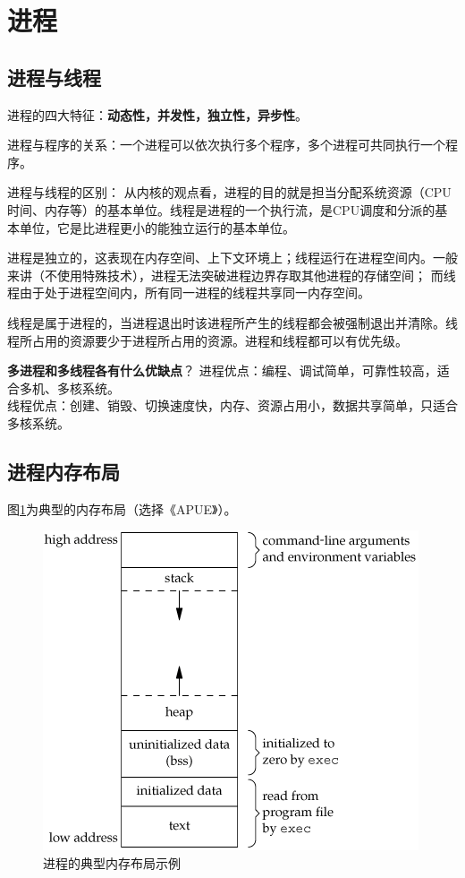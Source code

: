 
\section{进程}

\subsection{进程与线程}
进程的四大特征：\textbf{动态性，并发性，独立性，异步性}。

进程与程序的关系：一个进程可以依次执行多个程序，多个进程可共同执行一个程序。

进程与线程的区别：
从内核的观点看，进程的目的就是担当分配系统资源（CPU时间、内存等）的基本单位。线程是进程的一个执行流，是CPU调度和分派的基本单位，它是比进程更小的能独立运行的基本单位。

进程是独立的，这表现在内存空间、上下文环境上；线程运行在进程空间内。一般来讲（不使用特殊技术），进程无法突破进程边界存取其他进程的存储空间；
而线程由于处于进程空间内，所有同一进程的线程共享同一内存空间。

线程是属于进程的，当进程退出时该进程所产生的线程都会被强制退出并清除。线程所占用的资源要少于进程所占用的资源。进程和线程都可以有优先级。

\textbf{多进程和多线程各有什么优缺点}？
进程优点：编程、调试简单，可靠性较高，适合多机、多核系统。\\
线程优点：创建、销毁、切换速度快，内存、资源占用小，数据共享简单，只适合多核系统。

\subsection{进程内存布局}
图\ref{fig:processmemlayout}为典型的内存布局（选择《APUE》）。
\begin{figure}[ht]
	\begin{center}
		\includegraphics[keepaspectratio,width=0.5\paperwidth]{Pictures/Kernel/programMemLayout.png}
	\caption{进程的典型内存布局示例}
	\label{fig:processmemlayout}
	\end{center}
\end{figure}

